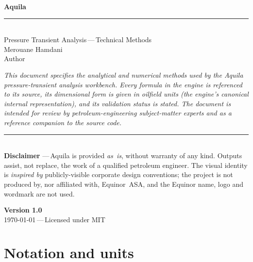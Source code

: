 \documentclass[11pt,a4paper]{article}
\begin{document}
\begin{titlepage}
\centering
\vspace*{2cm}
{\Huge\bfseries\color{aqdark} Aquila}\\[6pt]
\textcolor{aqred}{\rule{8cm}{2pt}}\\[10pt]
{\large\color{aqteal} Pressure Transient Analysis\,---\,Technical Methods}\\
\vspace{1.5cm}
{\large\color{aqdark} Merouane Hamdani}\\[4pt]
{\small\color{aqgrey} Author}\\
\vspace{2.5cm}
\begin{minipage}{0.8\textwidth}
\itshape\color{aqgrey}
This document specifies the analytical and numerical methods used by the
Aquila pressure-transient analysis workbench. Every formula in the
engine is referenced to its source, its dimensional form is given in
oilfield units (the engine's canonical internal representation), and its
validation status is stated. The document is intended for review by
petroleum-engineering subject-matter experts and as a reference companion
to the source code.
\end{minipage}
\vspace{1.5cm}

\begin{minipage}{0.8\textwidth}
\centering\footnotesize\color{aqgrey}
\textcolor{aqred}{\rule{4cm}{0.5pt}}\\[6pt]
\textbf{\color{aqdark}Disclaimer}\,\,---\,Aquila is provided \emph{as~is}, without
warranty of any kind. Outputs assist, not replace, the work of a
qualified petroleum engineer. The visual identity is \emph{inspired by}
publicly-visible corporate design conventions; the project is not produced
by, nor affiliated with, Equinor~ASA, and the Equinor name, logo and
wordmark are not used.
\end{minipage}

\vfill
{\large\bfseries Version 1.0}\\[6pt]
{\color{aqgrey}\today\,---\,Licensed under MIT}
\end{titlepage}

\tableofcontents
\newpage

\section{Notation and units}
\label{sec:notation}
\end{document}
